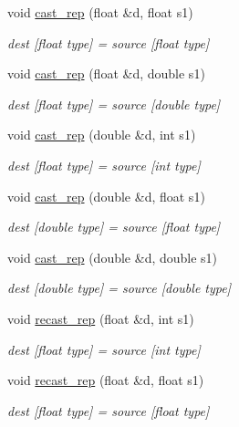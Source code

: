 \begin{DoxyCompactItemize}
void \mbox{\hyperlink{group__simpleword_gaa6817877d8caa75bb821988eb6f9bdb8}{cast\+\_\+rep}} (float \&d, float s1)
\begin{DoxyCompactList}\small\item\em dest \mbox{[}float type\mbox{]} = source \mbox{[}float type\mbox{]} \end{DoxyCompactList}\item 
void \mbox{\hyperlink{group__simpleword_gab0dd44662b2ec54866199a048cae439c}{cast\+\_\+rep}} (float \&d, double s1)
\begin{DoxyCompactList}\small\item\em dest \mbox{[}float type\mbox{]} = source \mbox{[}double type\mbox{]} \end{DoxyCompactList}\item 
void \mbox{\hyperlink{group__simpleword_gaeaf6ee66ca8c7e396f7b749088ac2992}{cast\+\_\+rep}} (double \&d, int s1)
\begin{DoxyCompactList}\small\item\em dest \mbox{[}float type\mbox{]} = source \mbox{[}int type\mbox{]} \end{DoxyCompactList}\item 
void \mbox{\hyperlink{group__simpleword_ga1d89d98529059fc73be75dce981e001d}{cast\+\_\+rep}} (double \&d, float s1)
\begin{DoxyCompactList}\small\item\em dest \mbox{[}double type\mbox{]} = source \mbox{[}float type\mbox{]} \end{DoxyCompactList}\item 
void \mbox{\hyperlink{group__simpleword_ga8cac7966a593620ed6aa821a74ebe0fd}{cast\+\_\+rep}} (double \&d, double s1)
\begin{DoxyCompactList}\small\item\em dest \mbox{[}double type\mbox{]} = source \mbox{[}double type\mbox{]} \end{DoxyCompactList}\item 
void \mbox{\hyperlink{group__simpleword_ga1b85638c2b2617f517f0d68dd5fd3a69}{recast\+\_\+rep}} (float \&d, int s1)
\begin{DoxyCompactList}\small\item\em dest \mbox{[}float type\mbox{]} = source \mbox{[}int type\mbox{]} \end{DoxyCompactList}\item 
void \mbox{\hyperlink{group__simpleword_ga9a35d7bf3c8e7160728164e4d077eb4f}{recast\+\_\+rep}} (float \&d, float s1)
\begin{DoxyCompactList}\small\item\em dest \mbox{[}float type\mbox{]} = source \mbox{[}float type\mbox{]} \end{DoxyCompactList}\item 

\end{DoxyCompactItemize}
